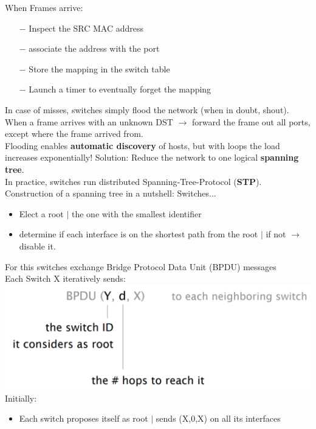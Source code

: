 \documentclass[a4paper, fontsize=8pt, landscape, DIV=1]{scrartcl}
\begin{document}
\begin{multicols*}{4}
   			When Frames arrive:
   			\vspace{-0.2cm} 
   			\begin{itemize}[noitemsep]
   				\item [$-$] Inspect the SRC MAC address
   				\item [$-$] associate the address with the port
   				\item [$-$] Store the mapping in the switch table
   				\item [$-$] Launch a timer to eventually forget the mapping
   			\end{itemize}
   		In case of misses, switches simply flood the network (when in doubt, shout).\\
   		When a frame arrives with an unknown DST $\rightarrow$ forward the frame out all ports, except where the frame arrived from.\\ 
   		Flooding enables \textbf{automatic discovery} of hosts, but with loops the load increases exponentially! Solution: Reduce the network to one logical \textbf{spanning tree}.\\
   		In practice, switches run distributed Spanning-Tree-Protocol (\textbf{STP}). \\
   		Construction of a spanning tree in a nutshell: Switches...
   		\begin{itemize}[noitemsep]
   			\item Elect a root $\vert$ the one with the smallest identifier
   			\item determine if each interface is on the shortest path from the root $\vert$ if not $\rightarrow$ disable it.
   		\end{itemize}
   		For this switches exchange Bridge Protocol Data Unit (BPDU) messages\\
   		Each Switch X iteratively sends: 
   		\includegraphics[width=\columnwidth]{images/Link_Layer/BPDU.png}
   		Initially: 
   		\vspace{-0.2cm}
   		\begin{itemize}[noitemsep]
   			\item Each switch proposes itself as root $\vert$ sends (X,0,X) on all its interfaces

\end{itemize}
\end{multicols*}
\end{document}
